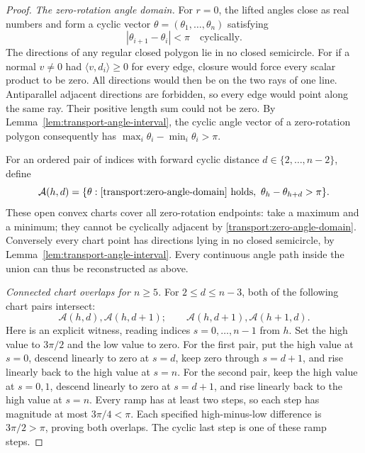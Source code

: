 \begin{proof}
\emph{The zero-rotation angle domain.}
For $r=0$, the lifted angles close as real numbers and form a cyclic vector
$\theta=(\theta_1,\ldots,\theta_n)$ satisfying
\begin{equation}\label{transport:zero-angle-domain}
 |\theta_{i+1}-\theta_i|<\pi\quad\text{cyclically}.
\end{equation}
The directions of any regular closed polygon lie in no closed semicircle.
For if a normal $v\ne0$ had $\langle v,d_i\rangle\geq0$ for every edge,
closure would force every scalar product to be zero. All directions would
then be on the two rays of one line. Antiparallel adjacent directions are
forbidden, so every edge would point along the same ray. Their positive
length sum could not be zero. By
Lemma~\ref{lem:transport-angle-interval}, the cyclic angle vector of a
zero-rotation polygon consequently has
$\max_i\theta_i-\min_i\theta_i>\pi$.

For an ordered pair of indices with forward cyclic distance
$d\in\{2,\ldots,n-2\}$, define
\begin{equation}\label{transport:chart}
 \mathcal A(h,d)=\{\theta:\eqref{transport:zero-angle-domain}\text{ holds},
                  \ \theta_h-\theta_{h+d}>\pi\}.
\end{equation}
These open convex charts cover all zero-rotation endpoints: take a maximum
and a minimum; they cannot be cyclically adjacent by
\eqref{transport:zero-angle-domain}. Conversely every chart point has
directions lying in no closed semicircle, by
Lemma~\ref{lem:transport-angle-interval}. Every continuous angle path inside
the union can thus be reconstructed as above.

\emph{Connected chart overlaps for $n\geq5$.}
For $2\leq d\leq n-3$, both of the following chart pairs intersect:
\begin{equation}\label{transport:chart-moves}
 \mathcal A(h,d),\mathcal A(h,d+1);
 \qquad \mathcal A(h,d+1),\mathcal A(h+1,d).
\end{equation}
Here is an explicit witness, reading indices $s=0,\ldots,n-1$ from $h$.
Set the high value to $3\pi/2$ and the low value to zero. For the first pair,
put the high value at $s=0$, descend linearly to zero at $s=d$, keep zero
through $s=d+1$, and rise linearly back to the high value at $s=n$.
For the second pair, keep the high value at $s=0,1$, descend linearly to zero
at $s=d+1$, and rise linearly back to the high value at $s=n$.
Every ramp has at least two steps, so each step has magnitude at most
$3\pi/4<\pi$. Each specified high-minus-low difference is $3\pi/2>\pi$,
proving both overlaps. The cyclic last step is one of these ramp steps.


\end{proof}

